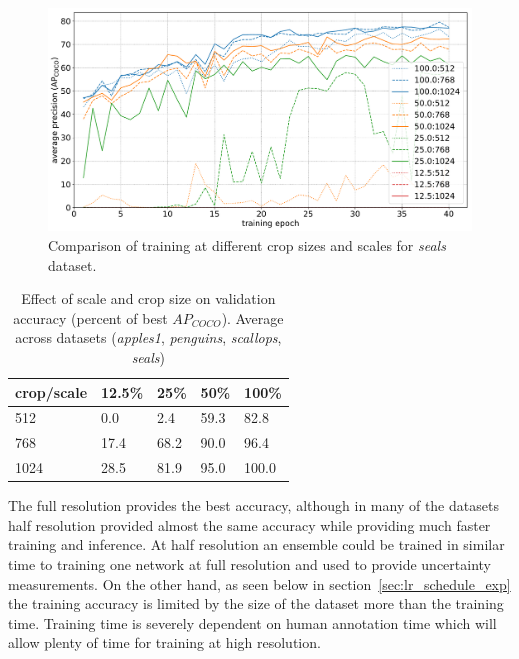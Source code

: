  
\begin{figure}[h]
  \centering
  \includegraphics[width=1.0\linewidth]{charts/training/crops_scales/seals.pdf}
  \caption{Comparison of training at different crop sizes and scales for \emph{seals} dataset. }  
  \label{fig:seals_crop_scale}
\end{figure}


\begin{table}[ht]
  \centering
    \caption{Effect of scale and crop size on validation accuracy (percent of best $AP_{COCO}$). Average across datasets (\emph{apples1}, \emph{penguins}, \emph{scallops}, \emph{seals}) }

  \begin{tabular}{ l | l l l l}
    crop/scale & 12.5\% & 25\% & 50\% & 100\% \\
    \toprule
        512   & 0.0  & 2.4  &  59.3  & 82.8 \\
        768   & 17.4 & 68.2  &  90.0 &  96.4 \\
        1024  & 28.5 & 81.9  &  95.0  & 100.0 \\
    \bottomrule
  \end{tabular}
\label{tab:accuracy_scale_crop}
\end{table}


The full resolution provides the best accuracy, although in many of the datasets half resolution provided almost the same accuracy while providing much faster training and inference. At half resolution an ensemble could be trained in similar time to training one network at full resolution and used to provide uncertainty measurements. On the other hand, as seen below in section~\ref{sec:lr_schedule_exp} the training accuracy is limited by the size of the dataset more than the training time. Training time is severely dependent on human annotation time which will allow plenty of time for training at high resolution.

